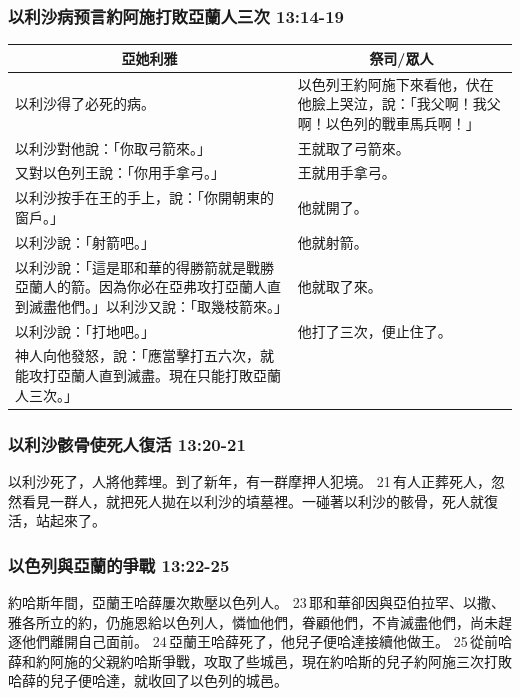 \subsubsection{以利沙病预言約阿施打敗亞蘭人三次 13:14-19}
\begin{table}[H]
\hspace{-5mm}
\centering
\begin{tabular}{p{9.95cm}|p{7.5cm}}\hline
\multicolumn{1}{c}{亞她利雅}&\multicolumn{1}{c}{祭司/眾人}\\\hline
以利沙得了必死的病。&以色列王約阿施下來看他，伏在他臉上哭泣，說：「我父啊！我父啊！以色列的戰車馬兵啊！」\\\hline
以利沙對他說：「你取弓箭來。」&王就取了弓箭來。\\\hline
又對以色列王說：「你用手拿弓。」&王就用手拿弓。\\\hline
以利沙按手在王的手上，說：「你開朝東的窗戶。」&他就開了。\\\hline
以利沙說：「射箭吧。」&他就射箭。\\\hline
以利沙說：「這是耶和華的得勝箭就是戰勝亞蘭人的箭。因為你必在亞弗攻打亞蘭人直到滅盡他們。」以利沙又說：「取幾枝箭來。」&他就取了來。\\\hline
以利沙說：「打地吧。」&他打了三次，便止住了。\\\hline
神人向他發怒，說：「應當擊打五六次，就能攻打亞蘭人直到滅盡。現在只能打敗亞蘭人三次。」&\\\hline
\end{tabular}
\end{table}


\subsubsection{以利沙骸骨使死人復活 13:20-21 }
以利沙死了，人將他葬埋。到了新年，有一群摩押人犯境。 21 有人正葬死人，忽然看見一群人，就把死人拋在以利沙的墳墓裡。一碰著以利沙的骸骨，死人就復活，站起來了。

\subsubsection{以色列與亞蘭的爭戰 13:22-25}
約哈斯年間，亞蘭王哈薛屢次欺壓以色列人。 23 耶和華卻因與亞伯拉罕、以撒、雅各所立的約，仍施恩給以色列人，憐恤他們，眷顧他們，不肯滅盡他們，尚未趕逐他們離開自己面前。 24 亞蘭王哈薛死了，他兒子便哈達接續他做王。 25 從前哈薛和約阿施的父親約哈斯爭戰，攻取了些城邑，現在約哈斯的兒子約阿施三次打敗哈薛的兒子便哈達，就收回了以色列的城邑。


